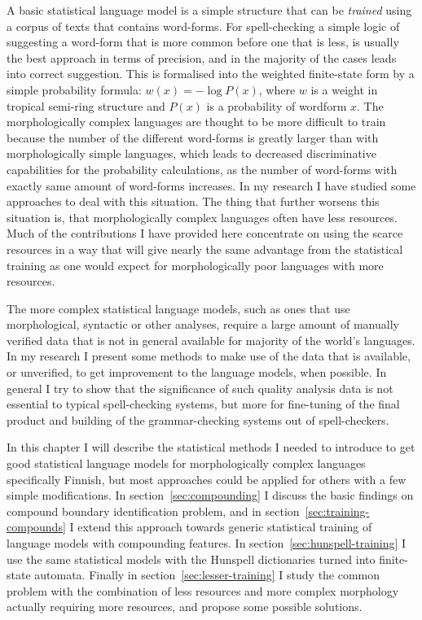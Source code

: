 \documentclass[officiallayout,draft]{unihelcompling}
\begin{document}
A basic statistical language model is a simple structure that can be
\emph{trained} using a corpus of texts that contains word-forms. For
spell-checking a simple logic of suggesting a word-form that is more common
before one that is less, is usually the best approach in terms of precision,
and in the majority of the cases leads into correct suggestion. This is
formalised into the weighted finite-state form by a simple probability formula:
$w(x) = -\log P(x)$, where $w$ is a weight in tropical semi-ring structure and
$P(x)$ is a probability of wordform $x$.  The morphologically complex languages
are thought to be more difficult to train because the number of the different
word-forms is greatly larger than with morphologically simple languages, which
leads to decreased discriminative capabilities for the probability
calculations, as the number of word-forms with exactly same amount of
word-forms increases. In my research I have studied some approaches to deal
with this situation. The thing that further worsens this situation is, that
morphologically complex languages often have less resources. Much of the
contributions I have provided here concentrate on using the scarce resources in
a way that will give nearly the same advantage from the statistical training as
one would expect for morphologically poor languages with more resources.

The more complex statistical language models, such as ones that use
morphological, syntactic or other analyses, require a large amount of
manually verified data that is not in general available for majority of the
world's languages. In my research I present some methods to make use of the
data that is available, or unverified, to get improvement to the language
models, when possible. In general I try to show that the significance of such
quality analysis data is not essential to typical spell-checking systems, but
more for fine-tuning of the final product and building of the grammar-checking
systems out of spell-checkers.

In this chapter I will describe the statistical methods I needed to introduce
to get good statistical language models for morphologically complex languages
specifically Finnish, but most approaches could be applied for others with a
few simple modifications. In section~\ref{sec:compounding} I discuss the basic
findings on compound boundary identification problem, and in
section~\ref{sec:training-compounds} I extend this approach towards generic
statistical training of language models with compounding features. In
section~\ref{sec:hunspell-training} I use the same statistical models with the
Hunspell dictionaries turned into finite-state automata. Finally in
section~\ref{sec:lesser-training} I study the common problem with the
combination of less resources and more complex morphology actually requiring
more resources, and propose some possible solutions.
\end{document}
